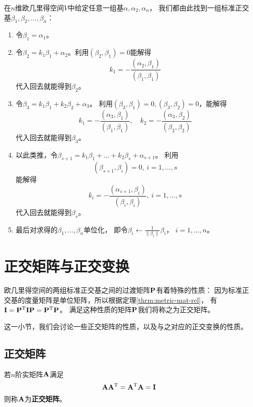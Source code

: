 \begin{theorem}
  在$n$维欧几里得空间$V$中给定任意一组基$\alpha,\alpha_2,\alpha_n$，
  我们都由此找到一组标准正交基$\beta_1,\beta_2,\dots,\beta_n$：
  \begin{enumerate}
    \item
    令$\beta_1=\alpha_1$。
    \item
    令$\beta_2=k_1\beta_1+\alpha_2$。利用$(\beta_2,\beta_1)=0$能解得
    \begin{displaymath}
      k_1 = -\frac{(\alpha_2,\beta_1)}{(\beta_1,\beta_1)}
    \end{displaymath}
    代入回去就能得到$\beta_2$。
    \item
    令$\beta_3=k_1\beta_1+k_2\beta_2+\alpha_3$。
    利用$(\beta_3,\beta_1)=0,(\beta_3,\beta_2)=0$，能解得
    \begin{displaymath}
      k_1 = -\frac{(\alpha_3,\beta_1)}{(\beta_1,\beta_1)},\quad
      k_2 = -\frac{(\alpha_3,\beta_2)}{(\beta_2,\beta_2)}
    \end{displaymath}
    代入回去就能得到$\beta_3$。
    \item
    以此类推，令$\beta_{s+1}=k_1\beta_1+\dots+k_2\beta_s+\alpha_{s+1}$。
    利用\[ (\beta_{s+1},\beta_{i})=0,\ i=1,\dots,s \]
    能解得
    \begin{displaymath}
      k_i = -\frac{(\alpha_{s+1},\beta_{i})}{(\beta_{i},\beta_{i})},
      \ i=1,\dots,s
    \end{displaymath}
    代入回去就能得到$\beta_s$。
    \item
    最后对求得的$\beta_1,\dots,\beta_n$单位化，
    即令$\beta_i\leftarrow\frac{1}{\|\beta_i\|}\beta_i$，
    $i=1,\dots,n$。
  \end{enumerate}
\end{theorem}

\section{正交矩阵与正交变换}
欧几里得空间的两组标准正交基之间的过渡矩阵$\mathbf{P}$有着特殊的性质：
因为标准正交基的度量矩阵是单位矩阵，所以根据定理\ref{thrm:metric-mat-rel}，
有$\mathbf{I}=\mathbf{P}^{\textrm{T}}\mathbf{I}\mathbf{P}=\mathbf{P}^{\textrm{T}}\mathbf{P}$。
满足这种性质的矩阵$\mathbf{P}$我们将称之为正交矩阵。

这一小节，我们会讨论一些正交矩阵的性质，以及与之对应的正交变换的性质。

\subsection{正交矩阵}
\begin{definition}[正交矩阵]
  若$n$阶实矩阵$\mathbf{A}$满足
  \[ \mathbf{A}\mathbf{A}^{\textrm{T}} = \mathbf{A}^{\textrm{T}}\mathbf{A} = \mathbf{I} \]
  则称$\mathbf{A}$为\textbf{正交矩阵}。
\end{definition}

